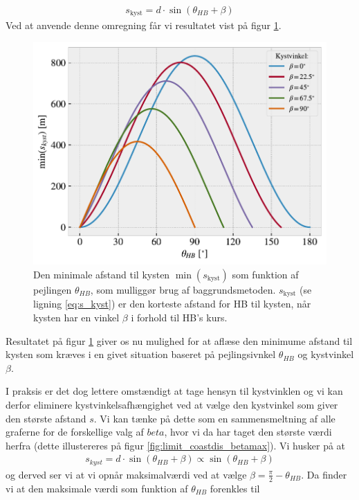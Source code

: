 \documentclass[%
 reprint,
nofootinbib,
aps,
]{revtex4-1}
\begin{document}
\begin{align}
  s_{\text{kyst}} = d\cdot \sin{(\theta_{HB} + \beta)}
  \label{eq:s_kyst}
\end{align}
Ved at anvende denne omregning får vi resultatet vist på figur \ref{fig:limit_coastdis}.
\begin{figure}[H]
  \includegraphics[width=\linewidth]{figures/limit_coastdis.pdf}
  \caption{Den minimale afstand til kysten $\min{(s_{\text{kyst}})}$ som funktion af pejlingen $\theta_{HB}$, som mulliggør brug af baggrundsmetoden. $s_{\text{kyst}}$ (se ligning \ref{eq:s_kyst}) er den korteste afstand for HB til kysten, når kysten har en vinkel $\beta$ i forhold til HB's kurs.}
  \label{fig:limit_coastdis}
\end{figure}
Resultatet på figur \ref{fig:limit_coastdis} giver os nu mulighed for at aflæse den minimume afstand til kysten som kræves i en givet situation baseret på pejlingsivnkel $\theta_{HB}$ og kystvinkel $\beta$. \par
I praksis er det dog lettere omstændigt at tage hensyn til kystvinklen og vi kan derfor eliminere kystvinkelsafhængighet ved at vælge den kystvinkel som giver den største afstand $s$. Vi kan tænke på dette som en sammensmeltning af alle graferne for de forskellige valg af $beta$, hvor vi da har taget den største værdi herfra (dette illustereres på figur \ref{fig:limit_coastdis_betamax}). Vi husker på at
\begin{align*}
  s_{kyst} = d\cdot \sin{(\theta_{HB} + \beta)} \propto \sin{(\theta_{HB} + \beta)}
\end{align*}
og derved ser vi at vi opnår maksimalværdi ved at vælge $\beta = \frac{\pi}{2} - \theta_{HB}$. Da finder vi at den maksimale værdi som funktion af $\theta_{HB}$ forenkles til
\end{document}
